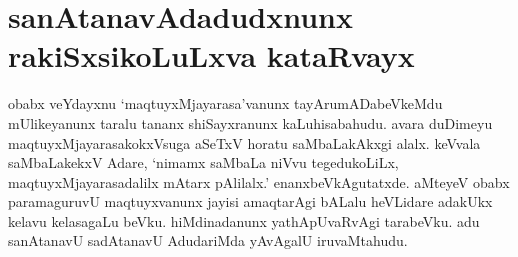 \section*{sanAtanavAdadudxnunx rakiSxsikoLuLxva kataRvayx}

obabx veYdayxnu `maqtuyxMjayarasa'vanunx tayArumADabeVkeMdu mUlikeyanunx taralu tananx shiSayxranunx kaLuhisabahudu. avara duDimeyu maqtuyxMjayarasakokxVsuga aSeTxV horatu saMbaLakAkxgi alalx. keVvala saMbaLakekxV Adare, `nimamx saMbaLa niVvu tegedukoLiLx, maqtuyxMjayarasadalilx mAtarx pAlilalx.' enanxbeVkAgutatxde. aMteyeV obabx paramaguruvU maqtuyxvanunx jayisi amaqtarAgi bALalu heVLidare adakUkx kelavu kelasagaLu beVku. hiMdinadanunx yathApUvaRvAgi tarabeVku. adu sanAtanavU sadAtanavU AdudariMda yAvAgalU iruvaMtahudu. 
